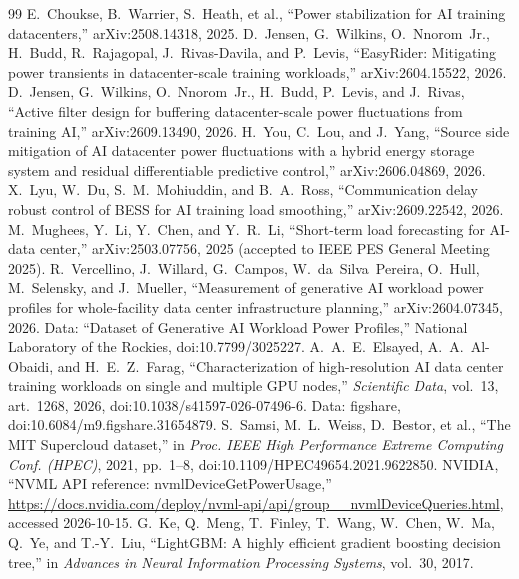 \documentclass[11pt]{article}
\begin{document}
\begin{thebibliography}{99}
 E.~Choukse, B.~Warrier, S.~Heath, et al., ``Power stabilization for AI training datacenters,'' arXiv:2508.14318, 2025.
 D.~Jensen, G.~Wilkins, O.~Nnorom~Jr., H.~Budd, R.~Rajagopal, J.~Rivas-Davila, and P.~Levis, ``EasyRider: Mitigating power transients in datacenter-scale training workloads,'' arXiv:2604.15522, 2026.
 D.~Jensen, G.~Wilkins, O.~Nnorom~Jr., H.~Budd, P.~Levis, and J.~Rivas, ``Active filter design for buffering datacenter-scale power fluctuations from training AI,'' arXiv:2609.13490, 2026.
 H.~You, C.~Lou, and J.~Yang, ``Source side mitigation of AI datacenter power fluctuations with a hybrid energy storage system and residual differentiable predictive control,'' arXiv:2606.04869, 2026.
 X.~Lyu, W.~Du, S.~M.~Mohiuddin, and B.~A.~Ross, ``Communication delay robust control of BESS for AI training load smoothing,'' arXiv:2609.22542, 2026.
 M.~Mughees, Y.~Li, Y.~Chen, and Y.~R.~Li, ``Short-term load forecasting for AI-data center,'' arXiv:2503.07756, 2025 (accepted to IEEE PES General Meeting 2025).
 R.~Vercellino, J.~Willard, G.~Campos, W.~da~Silva~Pereira, O.~Hull, M.~Selensky, and J.~Mueller, ``Measurement of generative AI workload power profiles for whole-facility data center infrastructure planning,'' arXiv:2604.07345, 2026. Data: ``Dataset of Generative AI Workload Power Profiles,'' National Laboratory of the Rockies, doi:10.7799/3025227.
 A.~A.~E.~Elsayed, A.~A.~Al-Obaidi, and H.~E.~Z.~Farag, ``Characterization of high-resolution AI data center training workloads on single and multiple GPU nodes,'' \emph{Scientific Data}, vol.~13, art.~1268, 2026, doi:10.1038/s41597-026-07496-6. Data: figshare, doi:10.6084/m9.figshare.31654879.
 S.~Samsi, M.~L.~Weiss, D.~Bestor, et al., ``The MIT Supercloud dataset,'' in \emph{Proc. IEEE High Performance Extreme Computing Conf. (HPEC)}, 2021, pp.~1--8, doi:10.1109/HPEC49654.2021.9622850.
 NVIDIA, ``NVML API reference: nvmlDeviceGetPowerUsage,'' \url{https://docs.nvidia.com/deploy/nvml-api/api/group__nvmlDeviceQueries.html}, accessed 2026-10-15.
 G.~Ke, Q.~Meng, T.~Finley, T.~Wang, W.~Chen, W.~Ma, Q.~Ye, and T.-Y.~Liu, ``LightGBM: A highly efficient gradient boosting decision tree,'' in \emph{Advances in Neural Information Processing Systems}, vol.~30, 2017.
\end{thebibliography}
\end{document}

